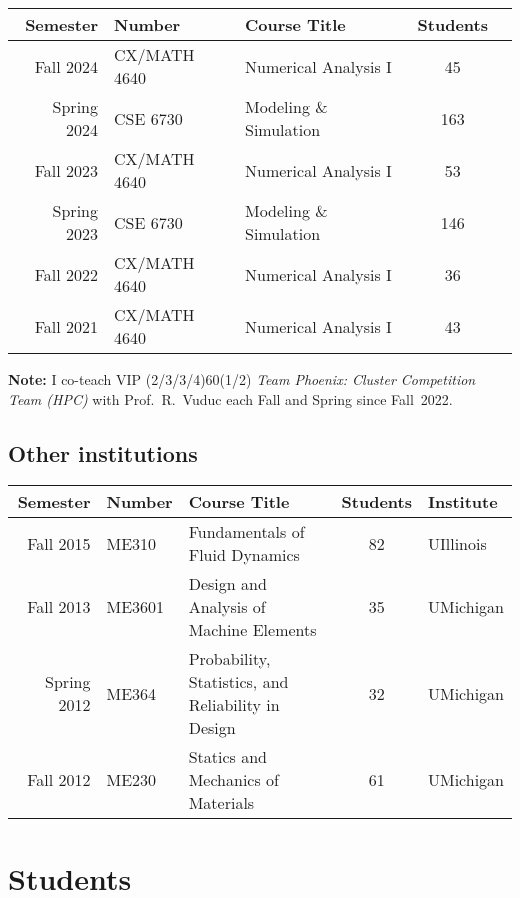\begin{center}
    \begin{longtable}{ r l l c c }
        \bf Semester&\bf Number     & \bf Course Title                  & \bf Students  \\ \midrule
        Fall 2024   & CX/MATH 4640   & Numerical Analysis I              & \phantom{1}45 \\
        Spring 2024 & CSE 6730       & Modeling \& Simulation            & 163 \\
        Fall 2023   & CX/MATH 4640   & Numerical Analysis I              & \phantom{1}53 \\
        Spring 2023 & CSE 6730       & Modeling \& Simulation            & 146           \\
        Fall 2022   & CX/MATH 4640   & Numerical Analysis I              & \phantom{1}36 \\
        Fall 2021   & CX/MATH 4640   & Numerical Analysis I              & \phantom{1}43 
    \end{longtable}
\end{center}
\vspace{-0.8cm}
\textbf{Note:} I co-teach VIP (2/3/3/4)60(1/2) \textit{Team Phoenix: Cluster Competition Team (HPC)} with Prof.~R.~Vuduc each Fall and Spring since Fall~2022.

\subsection{Other institutions}

\begin{center}
    \begin{tabular}{ r l l c l }
        \bf Semester  &\bf Number & \bf Course Title & \bf Students & \bf Institute \\
        \midrule
        Fall   2015 & ME310  & Fundamentals of Fluid Dynamics & 82 & UIllinois \\
        Fall   2013 & ME3601 & Design and Analysis of Machine Elements & 35 & UMichigan\\
        Spring 2012 & ME364  & Probability, Statistics, and Reliability in Design & 32 & UMichigan \\
        Fall   2012 & ME230  & Statics and Mechanics of Materials & 61 & UMichigan \\
    \end{tabular}
\end{center}

\section{Students}

